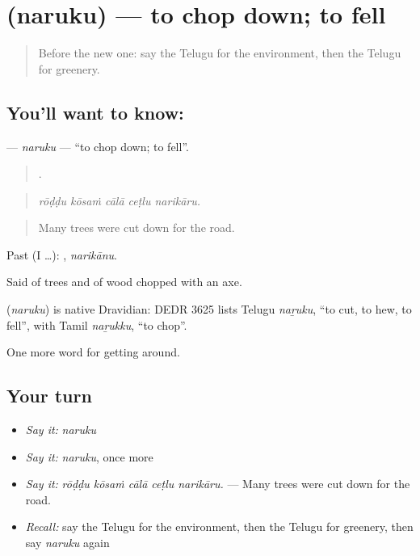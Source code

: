 \section[\texorpdfstring{\te{నరుకు} (naruku)}{నరుకు (naruku)}]{ (naruku) — to chop down; to fell}

\label{lesson:TE-C471-naruku}



\begin{quote}
Before the new one: say the Telugu for the environment, then the Telugu for greenery.
\end{quote}

\subsection*{You'll want to know: }
\textbf{} — \emph{naruku} — \textquotedblleft{}to chop down; to fell\textquotedblright{}.

\begin{quote}
    .
\end{quote}

\begin{quote}
\emph{rōḍḍu kōsaṁ cālā ceṭlu narikāru.}
\end{quote}

\begin{quote}
Many trees were cut down for the road.
\end{quote}

Past (I …): , \emph{narikānu}.

Said of trees and of wood chopped with an axe.

\begin{cousinweb}
\textbf{} (\emph{naruku}) is native Dravidian: DEDR 3625 lists Telugu \emph{naṟuku}, \textquotedblleft{}to cut, to hew, to fell\textquotedblright{}, with Tamil \emph{naṟukku}, \textquotedblleft{}to chop\textquotedblright{}.
\end{cousinweb}

\begin{grammarlens}[title={What you've built}]
One more word for getting around.
\end{grammarlens}

\subsection*{Your turn}
\begin{itemize}
\raggedright
  \item \emph{Say it:} \emph{naruku}
  \item \emph{Say it:} \emph{naruku}, once more
  \item \emph{Say it:} \emph{rōḍḍu kōsaṁ cālā ceṭlu narikāru.} — Many trees were cut down for the road.
  \item \emph{Recall:} say the Telugu for the environment, then the Telugu for greenery, then say \emph{naruku} again
\end{itemize}

